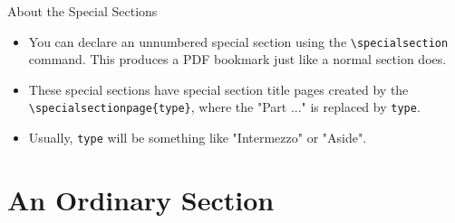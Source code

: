 \documentclass{beamer}
\begin{document}
\begin{frame}[plain]
\end{frame}

\begin{frame}[fragile]{About the Special Sections}
\begin{itemize}
	\item You can declare an \alert{unnumbered special section} using the \verb+\specialsection+ command. This produces a PDF bookmark just like a normal section does.
	\item These special sections have special section title pages created by the \verb+\specialsectionpage{type}+, where the "Part ..." is replaced by \texttt{type}.
	\item Usually, \texttt{type} will be something like "Intermezzo" or "Aside".
\end{itemize}
\end{frame}


\section{An Ordinary Section}

\begin{frame}[plain]
\sectionpage
\end{frame}
\end{document}
